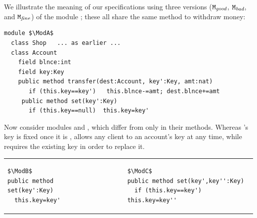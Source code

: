 
\begin{example}
\label{e:versions}
We illustrate the meaning of our specifications using three versions 
($\mbox{\normalfont{\texttt{M}}}_{{\textit{good}}}$,  $\mbox{\normalfont{\texttt{M}}}_{{\textit{bad}}}$, and $\mbox{\normalfont{\texttt{M}}}_{{\textit{fine}}}$) of the \Mshop module \cite{OOPSLA22};
these all share the same  method to withdraw money: 

\begin{lstlisting}[mathescape=true, language=Chainmail, frame=lines]
module $\ModA$      
  class Shop   ... as earlier ...
  class Account
    field blnce:int 
    field key:Key
    public method transfer(dest:Account, key':Key, amt:nat)
       if (this.key==key')   this.blnce-=amt; dest.blnce+=amt
     public method set(key':Key)
       if (this.key==null)  this.key=key'
\end{lstlisting}

\noindent Now consider modules \ModB and \ModC, which differ from \ModA
only in their  methods. Whereas \ModA 's key is fixed once it is ,
\ModB allows any client to  an account's key at any time, while
\ModC requires the existing key in order to replace it.

\vspace*{2mm}

\begin{tabular}{lll}
\begin{minipage}[b]{0.40\textwidth}

\begin{lstlisting}[mathescape=true, language=Chainmail, frame=lines]
$\ModB$
public method set(key':Key)
  this.key=key'
\end{lstlisting}
\end{minipage}
&\ \ \  \ \   &%
\begin{minipage}[b]{0.48\textwidth}
\begin{lstlisting}[mathescape=true, language=chainmail, frame=lines]
$\ModC$
public method set(key',key'':Key)
  if (this.key==key')  this.key=key''
\end{lstlisting}
\end{minipage} 
\end{tabular}


\end{example}
